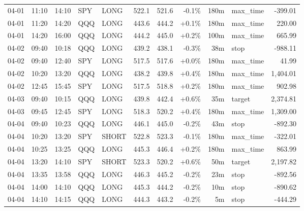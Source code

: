 \documentclass[11pt,a4paper,twoside]{article}
\begin{document}
\begin{center}
\begin{longtable}{>{\color{txtmain}}l l l l l r r r r >{\color{txtmain}}l r}
04-01 & 11:10 & 14:10 & SPY & LONG & 522.1 & 521.6 & \textcolor{lossred}{-0.1\%} & 180m & max\_time & \textcolor{lossred}{-399.01} \\
04-01 & 11:20 & 14:20 & QQQ & LONG & 443.6 & 444.2 & \textcolor{wingreen}{+0.1\%} & 180m & max\_time & \textcolor{wingreen}{220.00} \\
04-01 & 14:20 & 16:00 & QQQ & LONG & 444.2 & 445.0 & \textcolor{wingreen}{+0.2\%} & 100m & max\_time & \textcolor{wingreen}{665.99} \\
04-02 & 09:40 & 10:18 & QQQ & LONG & 439.2 & 438.1 & \textcolor{lossred}{-0.3\%} & 38m & stop & \textcolor{lossred}{-988.11} \\
04-02 & 09:40 & 12:40 & SPY & LONG & 517.5 & 517.6 & \textcolor{wingreen}{+0.0\%} & 180m & max\_time & \textcolor{wingreen}{41.99} \\
04-02 & 10:20 & 13:20 & QQQ & LONG & 438.2 & 439.8 & \textcolor{wingreen}{+0.4\%} & 180m & max\_time & \textcolor{wingreen}{1,404.01} \\
04-02 & 12:45 & 15:45 & SPY & LONG & 517.5 & 518.8 & \textcolor{wingreen}{+0.2\%} & 180m & max\_time & \textcolor{wingreen}{902.98} \\
04-03 & 09:40 & 10:15 & QQQ & LONG & 439.8 & 442.4 & \textcolor{wingreen}{+0.6\%} & 35m & target & \textcolor{wingreen}{2,374.81} \\
04-03 & 09:45 & 12:45 & SPY & LONG & 518.3 & 520.2 & \textcolor{wingreen}{+0.4\%} & 180m & max\_time & \textcolor{wingreen}{1,309.00} \\
04-04 & 09:40 & 10:23 & QQQ & LONG & 446.1 & 445.0 & \textcolor{lossred}{-0.2\%} & 43m & stop & \textcolor{lossred}{-892.30} \\
04-04 & 10:20 & 13:20 & SPY & SHORT & 522.8 & 523.3 & \textcolor{lossred}{-0.1\%} & 180m & max\_time & \textcolor{lossred}{-322.01} \\
04-04 & 10:25 & 13:25 & QQQ & LONG & 445.3 & 446.4 & \textcolor{wingreen}{+0.2\%} & 180m & max\_time & \textcolor{wingreen}{863.99} \\
04-04 & 13:20 & 14:10 & SPY & SHORT & 523.3 & 520.2 & \textcolor{wingreen}{+0.6\%} & 50m & target & \textcolor{wingreen}{2,197.82} \\
04-04 & 13:35 & 13:58 & QQQ & LONG & 446.3 & 445.2 & \textcolor{lossred}{-0.2\%} & 23m & stop & \textcolor{lossred}{-892.56} \\
04-04 & 14:00 & 14:10 & QQQ & LONG & 445.3 & 444.2 & \textcolor{lossred}{-0.2\%} & 10m & stop & \textcolor{lossred}{-890.62} \\
04-04 & 14:10 & 14:15 & QQQ & LONG & 444.3 & 443.2 & \textcolor{lossred}{-0.2\%} & 5m & stop & \textcolor{lossred}{-444.29} \\

\end{longtable}
\end{center}
\end{document}
